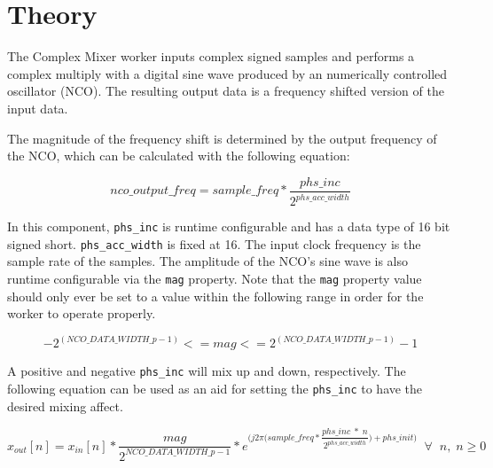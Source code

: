 \section*{Theory}
\begin{flushleft}
	The Complex Mixer worker inputs complex signed samples and performs a complex multiply with a digital sine wave produced by an numerically controlled oscillator (NCO). The resulting output data is a frequency shifted version of the input data.\medskip

	The magnitude of the frequency shift is determined by the output frequency of the NCO, which can be calculated with the following equation:

	\begin{equation} \label{eq:nco_output_freq}
		nco\_output\_freq = sample\_freq*\frac{phs\_inc}{2^{phs\_acc\_width}}
	\end{equation}

	In this component, \verb+phs_inc+ is runtime configurable and has a data type of 16 bit signed short. \verb+phs_acc_width+ is fixed at 16. The input clock frequency is the sample rate of the samples. The amplitude of the NCO's sine wave is also runtime configurable via the \verb+mag+ property. Note that the \verb+mag+ property value should only ever be set to a value within the following range in order for the worker to operate properly.

	\begin{equation} \label{eq:mag_limits_freq}
		-2^{(NCO\_DATA\_WIDTH\_p-1)} <= mag <= 2^{(NCO\_DATA\_WIDTH\_p-1)}-1
	\end{equation}

	A positive and negative \verb+phs_inc+ will mix up and down, respectively. The following equation can be used as an aid for setting the \verb+phs_inc+ to have the desired mixing affect.\medskip

	\begin{equation} \label{eq:positive_phs_inc_mixes_up}
		x_{out}[n] = x_{in}[n] * \dfrac{mag}{2^{NCO\_DATA\_WIDTH\_p-1}} * e^{\big(j2\pi\big(sample\_freq * \dfrac{phs\_inc \; * \; n}{2^{phs\_acc\_width}}\big) + phs\_init\big)} \;\; \forall \;\; n, \; n \ge 0
	\end{equation}

\end{flushleft}
